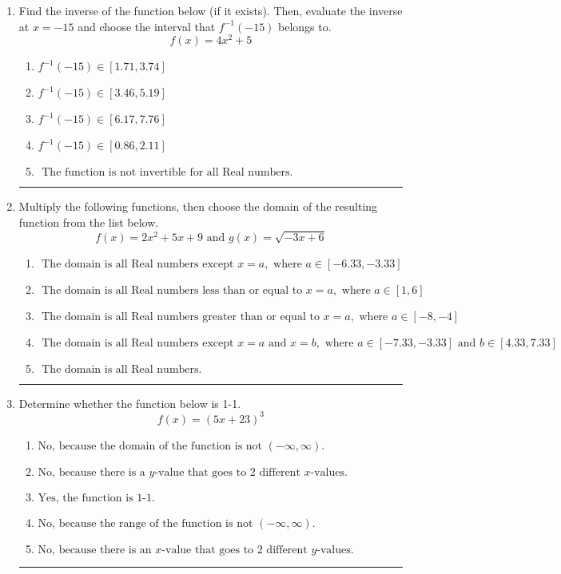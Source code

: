 \documentclass[14pt]{extbook}
\newcommand{\litem}[1]{\item#1\hspace*{-1cm}\rule{\textwidth}{0.4pt}}
\begin{document}
\begin{enumerate}
\litem{
Find the inverse of the function below (if it exists). Then, evaluate the inverse at $x = -15$ and choose the interval that $f^{-1}(-15)$ belongs to.\[ f(x) = 4 x^2 + 5 \]\begin{enumerate}[label=\Alph*.]
\item \( f^{-1}(-15) \in [1.71, 3.74] \)
\item \( f^{-1}(-15) \in [3.46, 5.19] \)
\item \( f^{-1}(-15) \in [6.17, 7.76] \)
\item \( f^{-1}(-15) \in [0.86, 2.11] \)
\item \( \text{ The function is not invertible for all Real numbers. } \)

\end{enumerate} }
\litem{
Multiply the following functions, then choose the domain of the resulting function from the list below.\[ f(x) = 2x^{2} +5 x + 9 \text{ and } g(x) = \sqrt{-3x+6}  \]\begin{enumerate}[label=\Alph*.]
\item \( \text{ The domain is all Real numbers except } x = a, \text{ where } a \in [-6.33, -3.33] \)
\item \( \text{ The domain is all Real numbers less than or equal to } x = a, \text{ where } a \in [1, 6] \)
\item \( \text{ The domain is all Real numbers greater than or equal to } x = a, \text{ where } a \in [-8, -4] \)
\item \( \text{ The domain is all Real numbers except } x = a \text{ and } x = b, \text{ where } a \in [-7.33, -3.33] \text{ and } b \in [4.33, 7.33] \)
\item \( \text{ The domain is all Real numbers. } \)

\end{enumerate} }
\litem{
Determine whether the function below is 1-1.\[ f(x) = (5 x + 23)^3 \]\begin{enumerate}[label=\Alph*.]
\item \( \text{No, because the domain of the function is not $(-\infty, \infty)$.} \)
\item \( \text{No, because there is a $y$-value that goes to 2 different $x$-values.} \)
\item \( \text{Yes, the function is 1-1.} \)
\item \( \text{No, because the range of the function is not $(-\infty, \infty)$.} \)
\item \( \text{No, because there is an $x$-value that goes to 2 different $y$-values.} \)


\end{enumerate}}
\end{enumerate}
\end{document}
